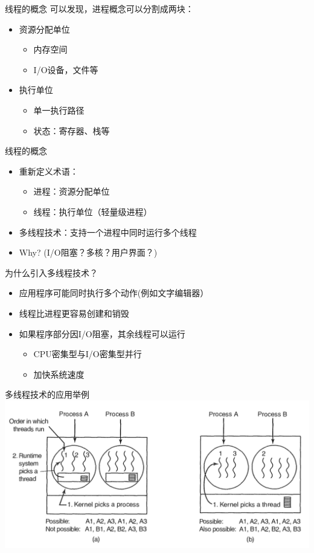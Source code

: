 \documentclass[xcolor=svgnames]{beamer}
\begin{document}
\begin{CJK*}{UTF8}{gbsn}
\begin{frame}{线程的概念}
可以发现，进程概念可以分割成两块：
\begin{itemize}
\item 资源分配单位
\begin{itemize}
\item 内存空间
\item I/O设备，文件等
\end{itemize}
\item 执行单位
\begin{itemize}
\item 单一执行路径
\item 状态：寄存器、栈等
\end{itemize}
\end{itemize}
\end{frame}

\begin{frame}{线程的概念}
\begin{itemize}
\item 重新定义术语：
\begin{itemize}
\item 进程：资源分配单位
\item 线程：执行单位（轻量级进程）
\end{itemize}
\item 多线程技术：支持一个进程中同时运行多个线程
\item Why? (I/O阻塞？多核？用户界面？)
\end{itemize}
\end{frame}

\begin{frame}{为什么引入多线程技术？}
\begin{itemize}
\item 应用程序可能同时执行多个动作(例如文字编辑器）
\item 线程比进程更容易创建和销毁
\item 如果程序部分因I/O阻塞，其余线程可以运行
\begin{itemize}
\item CPU密集型与I/O密集型并行
\item 加快系统速度
\end{itemize}
\end{itemize}
\end{frame}

\begin{frame}{多线程技术的应用举例}
\includegraphics[width=1.0\textwidth]{thread.png}
\end{frame}

\end{CJK*}
\end{document}
